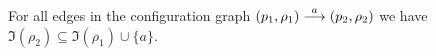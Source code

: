 %	
%
%


{
\begin{lemma}
\label{lem:tr-names}
For all edges in the configuration graph $(p_1,\rho_1) \overset{a}{\longrightarrow} (p_2,\rho_2)$ we have $\Im(\rho_2) \subseteq \Im(\rho_1) \cup \{ a \}$.
\end{lemma}
}

